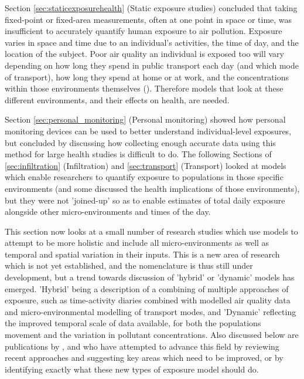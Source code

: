 Section \ref{sec:staticexposurehealth} (Static exposure studies) concluded that taking fixed-point or fixed-area measurements, often at one point in space or time, was insufficient to accurately quantify human exposure to air pollution. Exposure varies in space and time due to an individual’s activities, the time of day, and the location of the subject. Poor air quality an individual is exposed too will vary depending on how long they spend in public transport each day (and which mode of transport), how long they spend at home or at work, and the concentrations within those environments themselves (\cite{Ozkaynak2013}). Therefore models that look at these different environments, and their effects on health, are needed.

Section \ref{sec:personal_monitoring} (Personal monitoring) showed how personal monitoring devices can be used to better understand individual-level exposures, but concluded by discussing how collecting enough accurate data using this method for large health studies is difficult to do. The following Sections of \ref{sec:infiltration} (Infiltration) and \ref{sec:transport} (Transport) looked at models which enable researchers to quantify exposure to populations in those specific environments (and some discussed the health implications of those environments), but they were not 'joined-up' so as to enable estimates of total daily exposure alongside other micro-environments and times of the day.

This section now looks at a small number of research studies which use models to attempt to be more holistic and include all micro-environments as well as temporal and spatial variation in their inputs. This is a new area of research which is not yet established, and the nomenclature is thus still under development, but a trend towards discussion of 'hybrid' or 'dynamic' models has emerged. 'Hybrid' being a description of a combining of multiple approaches of exposure, such as time-activity diaries combined with modelled air quality data and micro-environmental modelling of transport modes, and 'Dynamic' reflecting the improved temporal scale of data available, for both the populations movement and the variation in pollutant concentrations. Also discussed below are publications by \cite{Ozkaynak2013}, \cite{Meliker2011} and \cite{Baxter2013} who have attempted to advance this field by reviewing recent approaches and suggesting key areas which need to be improved, or by identifying exactly what these new types of exposure model should do.

